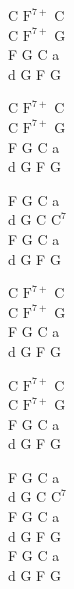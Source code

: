 \begin{chord}
\begin{footTwo}
C $\mathrm{F^{7+}}$ C\\
C $\mathrm{F^{7+}}$ G\\
F G C a\\
d G F G

C $\mathrm{F^{7+}}$ C\\
C $\mathrm{F^{7+}}$ G\\
F G C a\\
d G F G

F G C a\\
d G C $\mathrm{C^{7}}$\\
F G C a\\
d G F G

C $\mathrm{F^{7+}}$ C\\
C $\mathrm{F^{7+}}$ G\\
F G C a\\
d G F G

C $\mathrm{F^{7+}}$ C\\
C $\mathrm{F^{7+}}$ G\\
F G C a\\
d G F G

F G C a\\
d G C $\mathrm{C^{7}}$\\
F G C a\\
d G F G\\
F G C a\\
d G F G
\end{footTwo}
\end{chord}
